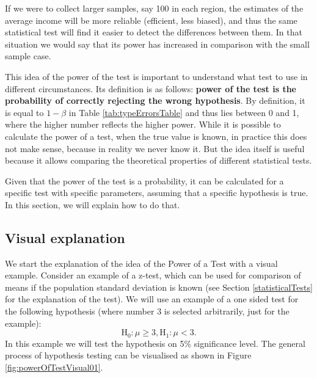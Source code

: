 \documentclass[
]{book}
\theoremstyle{definition}
\theoremstyle{definition}
\theoremstyle{definition}
\theoremstyle{definition}
\theoremstyle{remark}
\begin{document}
If we were to collect larger samples, say 100 in each region, the estimates of the average income will be more reliable (efficient, less biased), and thus the same statistical test will find it easier to detect the differences between them. In that situation we would say that its power has increased in comparison with the small sample case.

This idea of the power of the test is important to understand what test to use in different circumstances. Its definition is as follows: \textbf{power of the test is the probability of correctly rejecting the wrong hypothesis}. By definition, it is equal to \(1-\beta\) in Table \ref{tab:typeErrorsTable} and thus lies between 0 and 1, where the higher number reflects the higher power. While it is possible to calculate the power of a test, when the true value is known, in practice this does not make sense, because in reality we never know it. But the idea itself is useful because it allows comparing the theoretical properties of different statistical tests.

Given that the power of the test is a probability, it can be calculated for a specific test with specific parameters, assuming that a specific hypothesis is true. In this section, we will explain how to do that.

\subsection{Visual explanation}\label{visual-explanation}

We start the explanation of the idea of the Power of a Test with a visual example. Consider an example of a z-test, which can be used for comparison of means if the population standard deviation is known (see Section \ref{statisticalTests} for the explanation of the test). We will use an example of a one sided test for the following hypothesis (where number 3 is selected arbitrarily, just for the example):
\begin{equation}
    \mathrm{H}_0: \mu \geq 3, \mathrm{H}_1: \mu < 3.
    \label{eq:powerOfATestHypothesis}
\end{equation}
In this example we will test the hypothesis on 5\% significance level. The general process of hypothesis testing can be visualised as shown in Figure \ref{fig:powerOfTestVisual01}.
\end{document}
